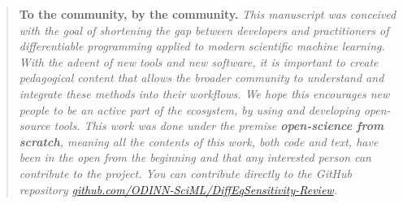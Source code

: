 \begin{quote}
    \textbf{To the community, by the community.}
    \textit{This manuscript was conceived with the goal of shortening the gap between developers and practitioners of differentiable programming applied to modern scientific machine learning. 
    With the advent of new tools and new software, it is important to create pedagogical content that allows the broader community to understand and integrate these methods into their workflows. 
    We hope this encourages new people to be an active part of the ecosystem, by using and developing open-source tools. 
    This work was done under the premise \textbf{open-science from scratch}, meaning all the contents of this work, both code and text, have been in the open from the beginning and that any interested person can contribute to the project. 
    You can contribute directly to the GitHub repository 
    \url{github.com/ODINN-SciML/DiffEqSensitivity-Review}.
    }
\end{quote}